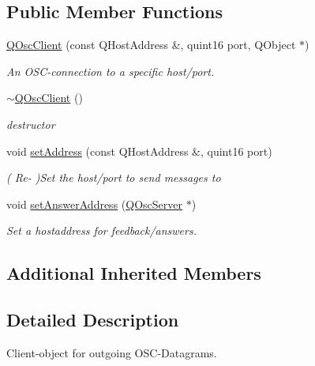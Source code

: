 \subsection*{Public Member Functions}
\begin{DoxyCompactItemize}
\item 
\hyperlink{class_q_osc_client_ab8137cbb3fc5c91cf8a40c7fef6edcae}{Q\+Osc\+Client} (const Q\+Host\+Address \&, quint16 port, Q\+Object $\ast$)
\begin{DoxyCompactList}\small\item\em An O\+S\+C-\/connection to a specific host/port. \end{DoxyCompactList}\item 
\mbox{\label{class_q_osc_client_ae31980ec929eb343c01747b06ba45eca}} 
\hyperlink{class_q_osc_client_ae31980ec929eb343c01747b06ba45eca}{$\sim$\+Q\+Osc\+Client} ()
\begin{DoxyCompactList}\small\item\em destructor \end{DoxyCompactList}\item 
\mbox{\label{class_q_osc_client_aeb14189d328f3d34b02c51e350ec57a8}} 
void \hyperlink{class_q_osc_client_aeb14189d328f3d34b02c51e350ec57a8}{set\+Address} (const Q\+Host\+Address \&, quint16 port)
\begin{DoxyCompactList}\small\item\em ( Re-\/ )Set the host/port to send messages to \end{DoxyCompactList}\item 
void \hyperlink{class_q_osc_client_aa8c58c8ca8821dba32c20d63d8ade376}{set\+Answer\+Address} (\hyperlink{class_q_osc_server}{Q\+Osc\+Server} $\ast$)
\begin{DoxyCompactList}\small\item\em Set a hostaddress for feedback/answers. \end{DoxyCompactList}\end{DoxyCompactItemize}
\subsection*{Additional Inherited Members}


\subsection{Detailed Description}
Client-\/object for outgoing O\+S\+C-\/\+Datagrams. 

